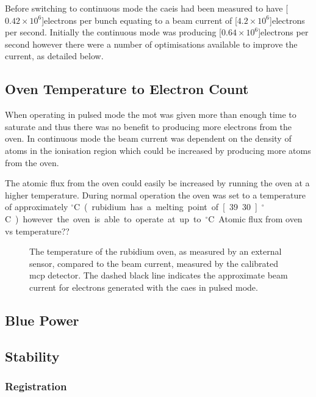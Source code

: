 Before switching to continuous mode the \gls{caeis} had been measured to have \unit[$0.42\times10^6$]{electrons per bunch} equating to a beam current of \unit[$4.2\times10^6$]{electrons per second}.
Initially the continuous mode was producing \unit[$0.64\times10^6$]{electrons per second} however there were a number of optimisations available to improve the current, as detailed below.

\subsection{Oven Temperature to Electron Count}
When operating in pulsed mode the \gls{mot} was given more than enough time to saturate and thus there was no benefit to producing more electrons from the oven.
In continuous mode the beam current was dependent on the density of atoms in the ionisation region which could be increased by producing more atoms from the oven.

The atomic flux from the oven could easily be increased by running the oven at a higher temperature.
During normal operation the oven was set to a temperature of approximately \unit[80]{$^\circ$C} (rubidium has a melting point of \unit[39.30]{$^\circ$C}) however the oven is able to operate at up to \unit[200]{$^\circ$C}.

{\color{red}Atomic flux from oven vs temperature??}

\begin{figure}
    \center
    
    \caption{The temperature of the rubidium oven, as measured by an external sensor, compared to the beam current, measured by the calibrated \gls{mcp} detector.
    The dashed black line indicates the approximate beam current for electrons generated with the \gls{caes} in pulsed mode.}
\end{figure}



\subsection{Blue Power}

\subsection{Stability}\label{section:stability}

\subsubsection{Registration}\label{section:registration}


